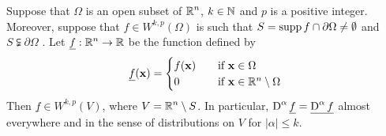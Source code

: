 \begin{lemma} \label{sob_denselem4}
Suppose that $\Omega$ is an open subset of $\displaystyle \mathbb{R}^n$,
$k\in \mathbb{N}$ and $p$ is a positive integer.  Moreover, suppose that
$\displaystyle f \in W^{k,p}(\Omega)$ 
is such that $S = \operatorname{supp} f \cap \partial \Omega \neq \emptyset$ and
$S \subsetneqq \partial \Omega$ \footnotemark.
Let $\displaystyle \underline{f}:\mathbb{R}^n \to \mathbb{R}$ be the function defined by
\[
\underline{f}(\mathbf{x}) =
\begin{cases}
f(\mathbf{x}) & \quad \text{if} \ \mathbf{x} \in \Omega \\
0 & \quad \text{if} \ \mathbf{x} \in \mathbb{R}^n \setminus \Omega
\end{cases}
\]
Then $\displaystyle \underline{f} \in W^{k,p}(V)$, where
$\displaystyle V = \mathbb{R}^n \setminus S$.
In particular,
$\displaystyle \operatorname{D}^\alpha \underline{f} = \underline{\operatorname{D}^\alpha f}$
almost everywhere and in the sense of distributions on $V$
for $|\alpha|\leq k$.
\end{lemma}


